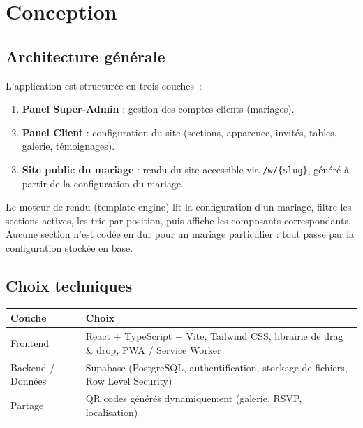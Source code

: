 \documentclass[11pt,a4paper]{article}
\begin{document}
\section{Conception}

\subsection{Architecture générale}
L'application est structurée en trois couches~:

\begin{enumerate}[leftmargin=1.2cm]
  \item \textbf{Panel Super-Admin} : gestion des comptes clients (mariages).
  \item \textbf{Panel Client} : configuration du site (sections, apparence,
        invités, tables, galerie, témoignages).
  \item \textbf{Site public du mariage} : rendu du site accessible via
        \texttt{/w/\{slug\}}, généré à partir de la configuration du mariage.
\end{enumerate}

Le moteur de rendu (template engine) lit la configuration d'un mariage, filtre les
sections actives, les trie par position, puis affiche les composants correspondants.
Aucune section n'est codée en dur pour un mariage particulier : tout passe par la
configuration stockée en base.

\subsection{Choix techniques}
\begin{longtable}{L{4cm}L{10cm}}
\toprule
\textbf{Couche} & \textbf{Choix} \\
\midrule
\endhead
Frontend & React + TypeScript + Vite, Tailwind CSS, librairie de drag \& drop,
PWA / Service Worker \\
Backend / Données & Supabase (PostgreSQL, authentification, stockage de fichiers,
Row Level Security) \\
Partage & QR codes générés dynamiquement (galerie, RSVP, localisation) \\
\bottomrule
\end{longtable}
\end{document}
